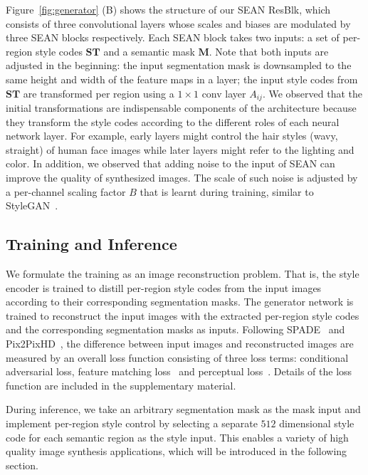 \documentclass[10pt,twocolumn,letterpaper]{article}
\begin{document}
\vspace*{2mm}
Figure~\ref{fig:generator} (B) shows the structure of our SEAN ResBlk, which consists of three convolutional layers whose scales and biases are modulated by three SEAN blocks respectively. 
Each SEAN block takes two inputs: a set of per-region style codes $\mathbf{ST}$ and a semantic mask $\mathbf{M}$.
Note that both inputs are adjusted in the beginning: the input segmentation mask is downsampled to the same height and width of the feature maps in a layer; the input style codes from $\mathbf{ST}$ are transformed per region using a $1 \times 1$ conv layer $A_{ij}$.
We observed that the initial transformations are indispensable components of the architecture because they transform the style codes according to the different roles of each neural network layer. 
For example, early layers might control the hair styles (\eg wavy, straight) of human face images while later layers might refer to the lighting and color.
In addition, we observed that adding noise to the input of SEAN can improve the quality of synthesized images.
The scale of such noise is adjusted by a per-channel scaling factor $B$ that is learnt during training, similar to StyleGAN~\cite{karras2018stylebased}.


\subsection{Training and Inference}

\vspace*{2mm} We formulate the training as an image reconstruction problem. That is, the style encoder is trained to distill per-region style codes from the input images according to their corresponding segmentation masks.
The generator network is trained to reconstruct the input images with the extracted per-region style codes and the corresponding segmentation masks as inputs. 
Following SPADE~\cite{park2019SPADE} and Pix2PixHD~\cite{wang2018pix2pixHD}, the difference between input images and reconstructed images are measured by an overall loss function consisting of three loss terms: conditional adversarial loss, feature matching loss~\cite{wang2018pix2pixHD} and perceptual loss~\cite{johnson2016perceptual}. 
Details of the loss function are included in the supplementary material.


\vspace*{2mm}
During inference, we take an arbitrary segmentation mask as the mask input and implement per-region style control by selecting a separate $512$ dimensional style code for each semantic region as the style input.
This enables a variety of high quality image synthesis applications, which will be introduced in the following section.
\end{document}
